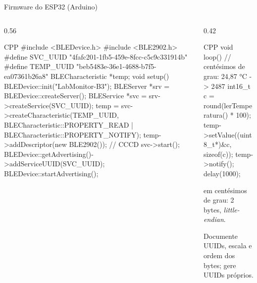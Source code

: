 \documentclass[aspectratio=169,10pt]{beamer}
\begin{document}
\begin{frame}[fragile]{Firmware do ESP32 (Arduino)}
  \begin{columns}[T]
    \begin{column}{0.56\textwidth}
\begin{codigo}[title=labmonitor\_ble.ino --- configuração]{CPP}
#include <BLEDevice.h>
#include <BLE2902.h>
#define SVC_UUID  "4fafc201-1fb5-459e-8fcc-c5c9c331914b"
#define TEMP_UUID "beb5483e-36e1-4688-b7f5-ea07361b26a8"
BLECharacteristic *temp;
void setup() {
  BLEDevice::init("LabMonitor-B3");
  BLEServer *srv = BLEDevice::createServer();
  BLEService *svc = srv->createService(SVC_UUID);
  temp = svc->createCharacteristic(TEMP_UUID,
    BLECharacteristic::PROPERTY_READ |
    BLECharacteristic::PROPERTY_NOTIFY);
  temp->addDescriptor(new BLE2902());   // CCCD
  svc->start();
  BLEDevice::getAdvertising()->addServiceUUID(SVC_UUID);
  BLEDevice::startAdvertising();
}
\end{codigo}
    \end{column}
    \begin{column}{0.42\textwidth}
\begin{codigo}[title=--- laço principal]{CPP}
void loop() {
  // centésimos de grau: 24,87 °C -> 2487
  int16_t c = round(lerTemperatura() * 100);
  temp->setValue((uint8_t*)&c, sizeof(c));
  temp->notify();
  delay(1000);
}
\end{codigo}
      \begin{conceito}
         em centésimos de grau: 2 bytes, \emph{little-endian}.
      \end{conceito}
      \begin{atencao}[Contrato]
        Documente UUIDs, escala e ordem dos bytes; gere UUIDs próprios.
      \end{atencao}
    \end{column}
  \end{columns}
\end{frame}
\end{document}
